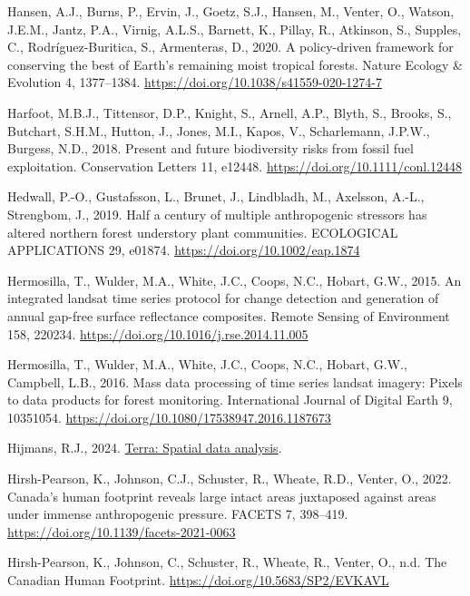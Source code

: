 \documentclass[
]{agujournal2019}
\newlength{\cslhangindent}
\newenvironment{CSLReferences}[2] %
 {\begin{list}{}{%
  \setlength{\itemindent}{0pt}
  \setlength{\leftmargin}{0pt}
  \setlength{\parsep}{0pt}
  \ifodd #1
   \setlength{\leftmargin}{\cslhangindent}
   \setlength{\itemindent}{-1\cslhangindent}
  \fi
  \setlength{\itemsep}{#2\baselineskip}}}
 {\end{list}}
\begin{document}
\begin{CSLReferences}{1}{0}
Hansen, A.J., Burns, P., Ervin, J., Goetz, S.J., Hansen, M., Venter, O.,
Watson, J.E.M., Jantz, P.A., Virnig, A.L.S., Barnett, K., Pillay, R.,
Atkinson, S., Supples, C., Rodríguez-Buritica, S., Armenteras, D., 2020.
A policy-driven framework for conserving the best of Earth{'}s remaining
moist tropical forests. Nature Ecology \& Evolution 4, 1377--1384.
\url{https://doi.org/10.1038/s41559-020-1274-7}

Harfoot, M.B.J., Tittensor, D.P., Knight, S., Arnell, A.P., Blyth, S.,
Brooks, S., Butchart, S.H.M., Hutton, J., Jones, M.I., Kapos, V.,
Scharlemann, J.P.W., Burgess, N.D., 2018. Present and future
biodiversity risks from fossil fuel exploitation. Conservation Letters
11, e12448. \url{https://doi.org/10.1111/conl.12448}

Hedwall, P.-O., Gustafsson, L., Brunet, J., Lindbladh, M., Axelsson,
A.-L., Strengbom, J., 2019. Half a century of multiple anthropogenic
stressors has altered northern forest understory plant communities.
ECOLOGICAL APPLICATIONS 29, e01874.
\url{https://doi.org/10.1002/eap.1874}

Hermosilla, T., Wulder, M.A., White, J.C., Coops, N.C., Hobart, G.W.,
2015. An integrated landsat time series protocol for change detection
and generation of annual gap-free surface reflectance composites. Remote
Sensing of Environment 158, 220234.
\url{https://doi.org/10.1016/j.rse.2014.11.005}

Hermosilla, T., Wulder, M.A., White, J.C., Coops, N.C., Hobart, G.W.,
Campbell, L.B., 2016. Mass data processing of time series landsat
imagery: Pixels to data products for forest monitoring. International
Journal of Digital Earth 9, 10351054.
\url{https://doi.org/10.1080/17538947.2016.1187673}

Hijmans, R.J., 2024. \href{https://rspatial.org/}{Terra: Spatial data
analysis}.

Hirsh-Pearson, K., Johnson, C.J., Schuster, R., Wheate, R.D., Venter,
O., 2022. Canada{'}s human footprint reveals large intact areas
juxtaposed against areas under immense anthropogenic pressure. FACETS 7,
398--419. \url{https://doi.org/10.1139/facets-2021-0063}

Hirsh-Pearson, K., Johnson, C., Schuster, R., Wheate, R., Venter, O.,
n.d. The Canadian Human Footprint.
\url{https://doi.org/10.5683/SP2/EVKAVL}


\end{CSLReferences}
\end{document}
